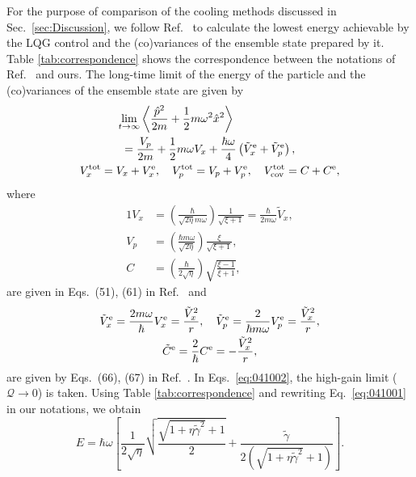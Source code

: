 \documentclass[aps,pra,superscriptaddress,twocolumn
]{revtex4-2}
\begin{document}
 For the purpose of comparison of the cooling methods discussed 
 in Sec.~\ref{sec:Discussion}, 
 {we follow Ref.~\cite{PhysRevA.60.2700} to calculate
  the lowest energy achievable by the LQG control
 and the (co)variances of the ensemble state prepared by it.} 
 Table \ref{tab:correspondence} shows 
 the correspondence between the notations of Ref.~\cite{PhysRevA.60.2700} and ours.
 The long-time limit of the energy of the particle 
 {and the (co)variances of the ensemble state are} given by 
 \begin{gather}
   \hspace{-30pt}\lim_{t\to \infty} \left\langle \frac{\hat p^2}{2m} + \frac{1}{2}m\omega^2 \hat x^2 \right\rangle \hspace{30pt} \notag\\ =
  \frac{V_p}{2m} + \frac{1}{2}m\omega V_x 
  +\frac{\hbar\omega}{4} \left(\tilde V_x^{\rm e} + \tilde V_p^{\rm e}\right),\label{eq:041001} \\
  {V_x^{\rm tot} = V_x + V_x^{\rm e} ,\quad 
  V_p^{\rm tot} =  V_p + V_p^{\rm e},\quad 
  V_{\rm cov}^{\rm tot} =  C + C^{\rm e}},
 \end{gather}
 where 
 \begin{alignat}{1}
  V_x &= \left(\frac{\hbar}{\sqrt{2\eta}m\omega}\right) \frac{1}{\sqrt{\xi+1}} 
  = \frac{\hbar}{2m\omega} \tilde V_x, \label{eq:conditioned_state_Vx} \\ 
  V_p &= \left(\frac{\hbar m \omega}{\sqrt{2\eta}}\right) \frac{\xi}{\sqrt{\xi+1}}
  , \label{eq:conditioned_state_Vp}\\
  C &= \left(\frac{\hbar}{2\sqrt{\eta}}\right)\sqrt{\frac{\xi-1}{\xi+1}}, 
  \label{eq:conditioned_state_C}
 \end{alignat}
  are given in Eqs.~(51), (61) in Ref.~\cite{PhysRevA.60.2700}
 and 
 \begin{gather}
  \tilde V_x^{\rm e} =\frac{2m\omega}{\hbar} V_x^{\rm e} 
  = \frac{\tilde V_x^2}{r}, \quad 
  \tilde V_p^{\rm e} = \frac{2}{\hbar m \omega} V_p^{\rm e} 
  = \frac{\tilde V_x^2}{r}, \\
  \tilde C^{\rm e} = \frac{2}{\hbar} C^{\rm e} = -\frac{\tilde V_x^2}{r}, 
   \label{eq:041002}
 \end{gather} 
 are given 
 by Eqs.~(66), (67) in Ref.~\cite{PhysRevA.60.2700}.
 In Eqs.~\eqref{eq:041002}, the high-gain limit ($\mathcal{Q} \to 0$) is taken.
 Using Table \ref{tab:correspondence} and rewriting Eq.~\eqref{eq:041001} in our notations, 
 we obtain 
 \begin{equation}
  E = \hbar \omega
  \left[\frac{1}{2\sqrt{\eta}} \sqrt{\frac{\sqrt{1+\eta \tilde \gamma^2} + 1}{2}}
  + \frac{\tilde \gamma}{2(\sqrt{1+\eta \tilde \gamma^2}+1)}
  \right]. \label{appeq:LQG}
 \end{equation}
\end{document}
